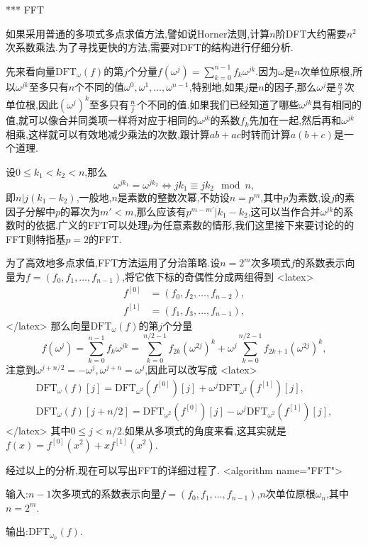 *** FFT

如果采用普通的多项式多点求值方法,譬如说Horner法则,计算$n$阶DFT大约需要$n^2$次系数乘法.为了寻找更快的方法,需要对DFT的结构进行仔细分析.

先来看向量$\mathrm{DFT}_\omega(f)$的第$j$个分量$f(\omega^j)=\sum\limits_{k=0}^{n-1}f_k\omega^{jk}$.因为$\omega$是$n$次单位原根,所以$\omega^{jk}$至多只有$n$个不同的值$\omega^0,\omega^1,\ldots,\omega^{n-1}$,特别地,如果$j$是$n$的因子,那么$\omega^j$是${n\over j}$次单位根,因此$(\omega^j)^k$至多只有${n\over j}$个不同的值.如果我们已经知道了哪些$\omega^{jk}$具有相同的值,就可以像合并同类项一样将对应于相同的$\omega^{jk}$的系数$f_k$先加在一起,然后再和$\omega^{jk}$相乘,这样就可以有效地减少乘法的次数,跟计算$ab+ac$时转而计算$a(b+c)$是一个道理.

设$0\le k_1<k_2<n$,那么$$\omega^{jk_1}=\omega^{jk_2}\Leftrightarrow jk_1\equiv jk_2\mod n,$$即$n|j(k_1-k_2)$,一般地,$n$是素数的整数次幂,不妨设$n=p^m$,其中$p$为素数,设$j$的素因子分解中$p$的幂次为$m'<m$,那么应该有$p^{m-m'}|k_1-k_2$,这可以当作合并$\omega^{jk}$的系数时的依据.广义的FFT可以处理$p$为任意素数的情形,我们这里接下来要讨论的的FFT则特指基$p=2$的FFT.

为了高效地多点求值,FFT方法运用了分治策略.设$n=2^m$次多项式$f$的系数表示向量为$f=(f_0,f_1,\ldots,f_{n-1})$,将它依下标的奇偶性分成两组得到
<latex>
\begin{align*}
f^{[0]}&=(f_0,f_2,\ldots,f_{n-2}),\\
f^{[1]}&=(f_1,f_3,\ldots,f_{n-1}),
\end{align*}
</latex>
那么向量$\mathrm{DFT}_\omega(f)$的第$j$个分量$$f(\omega^j)=\sum_{k=0}^{n-1}f_k\omega^{jk}=\sum_{k=0}^{n/2-1}f_{2k}(\omega^{2j})^k+\omega^j\sum_{k=0}^{n/2-1}f_{2k+1}(\omega^{2j})^k,$$注意到$\omega^{j+n/2}=-\omega^j,\omega^{j+n}=\omega^j$,因此可以改写成
<latex>
\begin{align*}
\mathrm{DFT}_\omega(f)[j]=\mathrm{DFT}_{\omega^2}(f^{[0]})[j]+\omega^j\mathrm{DFT}_{\omega^2}(f^{[1]})[j],\\
\mathrm{DFT}_\omega(f)[j+n/2]=\mathrm{DFT}_{\omega^2}(f^{[0]})[j]-\omega^j\mathrm{DFT}_{\omega^2}(f^{[1]})[j],
\end{align*}
</latex>
其中$0\le j<n/2$.如果从多项式的角度来看,这其实就是$f(x)=f^{[0]}(x^2)+xf^{[ 1]}(x^2)$.

经过以上的分析,现在可以写出FFT的详细过程了.
<algorithm  name="FFT">

输入:$n-1$次多项式的系数表示向量$f=(f_0,f_1,\ldots,f_{n-1})$,$n$次单位原根$\omega_n$,其中$n=2^m$.

输出:$\mathrm{DFT}_{\omega_n}(f)$.

